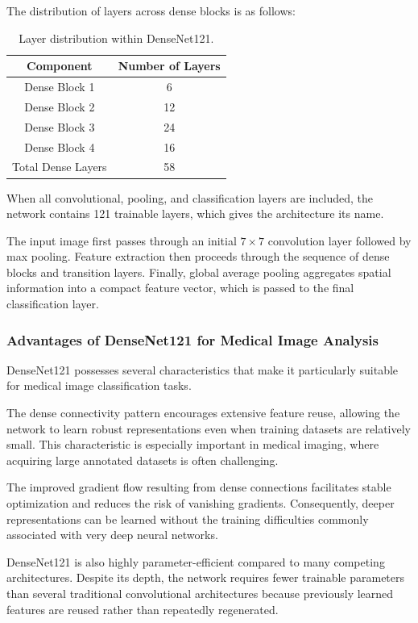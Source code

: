 The distribution of layers across dense blocks is as follows:

\begin{table}[H]
	\centering
	\caption{Layer distribution within DenseNet121.}
	\begin{tabular}{|c|c|}
		\hline
		Component & Number of Layers \\
		\hline
		Dense Block 1 & 6 \\
		Dense Block 2 & 12 \\
		Dense Block 3 & 24 \\
		Dense Block 4 & 16 \\
		\hline
		Total Dense Layers & 58 \\
		\hline
	\end{tabular}
	\label{tab:densenet121_blocks}
\end{table}

When all convolutional, pooling, and classification layers are included, the network contains 121 trainable layers, which gives the architecture its name.

The input image first passes through an initial $7\times7$ convolution layer followed by max pooling. Feature extraction then proceeds through the sequence of dense blocks and transition layers. Finally, global average pooling aggregates spatial information into a compact feature vector, which is passed to the final classification layer.

\subsubsection{Advantages of DenseNet121 for Medical Image Analysis}

DenseNet121 possesses several characteristics that make it particularly suitable for medical image classification tasks.

The dense connectivity pattern encourages extensive feature reuse, allowing the network to learn robust representations even when training datasets are relatively small. This characteristic is especially important in medical imaging, where acquiring large annotated datasets is often challenging.

The improved gradient flow resulting from dense connections facilitates stable optimization and reduces the risk of vanishing gradients. Consequently, deeper representations can be learned without the training difficulties commonly associated with very deep neural networks.

DenseNet121 is also highly parameter-efficient compared to many competing architectures. Despite its depth, the network requires fewer trainable parameters than several traditional convolutional architectures because previously learned features are reused rather than repeatedly regenerated.

